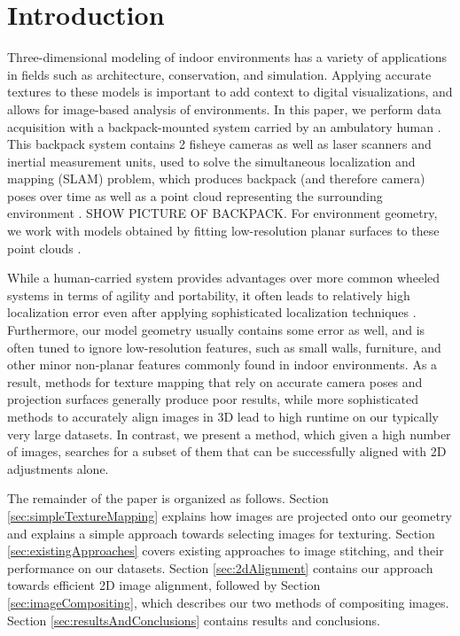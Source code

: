 \documentclass[]{spie}  %
\begin{document}
\section{Introduction}
\label{sec:introduction} %
Three-dimensional modeling of indoor environments has a variety of
applications in fields such as architecture, conservation, and
simulation. Applying accurate textures to these models is important to
add context to digital visualizations, and allows for image-based
analysis of environments. In this paper, we perform data acquisition
with a backpack-mounted system carried by an ambulatory human
\cite{liu2010indoor}. This backpack system contains 2 fisheye cameras
as well as laser scanners and inertial measurement units,
used to solve the simultaneous localization and mapping (SLAM)
problem, which produces backpack (and therefore camera) poses over
time as well as a point cloud representing the surrounding environment
\cite{chen2010indoor, liu2010indoor, kua2012loopclosure}. SHOW PICTURE OF BACKPACK. For
environment geometry, we work with models obtained by fitting
low-resolution planar surfaces to these point clouds
\cite{sanchez2012point}.

While a human-carried system provides advantages over more common
wheeled systems in terms of agility and portability, it often leads to
relatively high localization error even after applying sophisticated
localization techniques \cite{liu2010indoor}. Furthermore, our model
geometry usually contains some error as well, and is often tuned to
ignore low-resolution features, such as small walls, furniture, and
other minor non-planar features commonly found in indoor
environments. As a result, methods for texture mapping that rely on
accurate camera poses and projection surfaces generally produce poor
results, while more sophisticated methods to accurately align images
in 3D lead to high runtime on our typically very large datasets. In
contrast, we present a method, which given a high number of images,
searches for a subset of them that can be successfully aligned with 2D
adjustments alone.

The remainder of the paper is organized as follows. Section
\ref{sec:simpleTextureMapping} explains how images are projected onto
our geometry and explains a simple approach towards selecting images
for texturing. Section \ref{sec:existingApproaches} covers existing
approaches to image stitching, and their performance on our
datasets. Section \ref{sec:2dAlignment} contains our approach towards
efficient 2D image alignment, followed by Section
\ref{sec:imageCompositing}, which describes our two methods of
compositing images. Section \ref{sec:resultsAndConclusions} contains
results and conclusions.
\end{document}
